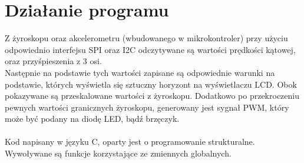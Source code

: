 \documentclass[12pt]{article}
\let\origfigure\figure
\let\endorigfigure\endfigure
\renewenvironment{figure}[1][2] {
    \expandafter\origfigure\expandafter[H]
} {
    \endorigfigure
}
\begin{document}
\begin{figure}[H]
\centering
{}
\end{figure}

\newpage
\section{Działanie programu}
         Z żyroskopu oraz akcelerometru (wbudowanego w mikrokontroler) przy użyciu odpowiednio interfejsu SPI oraz I2C odczytywane są wartości prędkości kątowej, oraz przyśpieszenia z 3 osi.\\
         
         Następnie na podstawie tych wartości zapisane są odpowiednie warunki na podstawie, których wyświetla się sztuczny horyzont na wyświetlaczu LCD. Obok pokazywane są przeskalowane wartości z żyroskopu. Dodatkowo po przekroczeniu pewnych wartości granicznych żyroskopu, generowany jest sygnał PWM, który może być podany na diodę LED, bądź brzęczyk.\\
        \\
        Kod napisany w języku C, oparty jest o programowanie strukturalne. Wywoływane są funkcje korzystające ze zmiennych globalnych.
        
\end{document}
